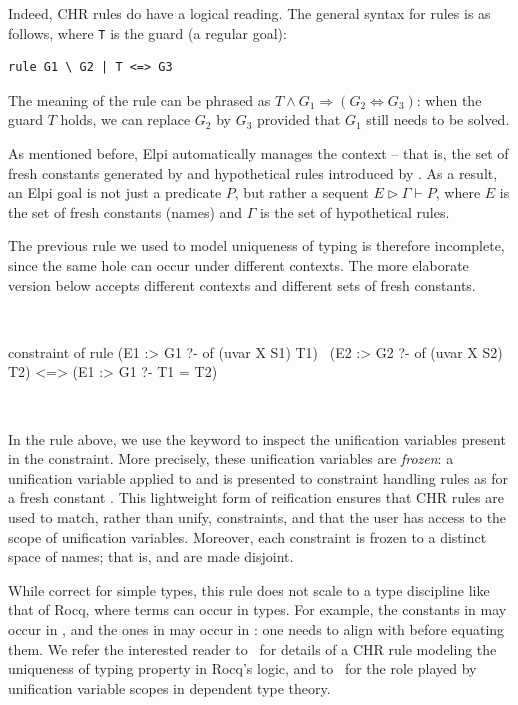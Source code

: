 \documentclass[a4paper, 11pt]{book}
\newenvironment{elpicode}
  {\VerbatimEnvironment~\\\begin{elpibox}\begin{xelpicode}}{\end{xelpicode}
\end{elpibox}\\}
\begin{document}
Indeed, CHR rules do have a logical reading. The general syntax for rules is
as follows, where \texttt{T} is the guard (a regular goal):

\begin{verbatim}
rule G1 \ G2 | T <=> G3
\end{verbatim}

\noindent
The meaning of the rule can be phrased as $T \land G_1 \Rightarrow (G_2
\Leftrightarrow G_3)$: when the guard $T$ holds, we can replace $G_2$ by $G_3$
provided that $G_1$ still needs to be solved.

As mentioned before, Elpi automatically manages the context -- that is, the set
of fresh constants generated by  and hypothetical rules introduced by
\elpi{=>}. As a result, an Elpi goal is not just a predicate $P$, but rather a
sequent $E \triangleright  \Gamma \vdash P$, where $E$ is the set of fresh
constants (names) and $\Gamma$ is the set of hypothetical rules.

The previous rule we used to model uniqueness of typing is therefore incomplete,
since the same hole can occur under different contexts. The more elaborate
version below accepts different contexts and different sets of fresh constants.


\begin{elpicode}
constraint of {
  rule (E1 :> G1 ?- of (uvar X S1) T1)
     \ (E2 :> G2 ?- of (uvar X S2) T2)
   <=> (E1 :> G1 ?- T1 = T2)
}
\end{elpicode}

\noindent
In the rule above, we use the keyword  to inspect the unification
variables present in the constraint. More precisely, these unification
variables are \emph{frozen}: a unification variable  applied to
 and  is presented to constraint handling rules as
 for a fresh constant . This lightweight form of
reification ensures that CHR rules are used to match, rather than unify,
constraints, and that the user has access to the scope of unification
variables. Moreover, each constraint is frozen to a distinct space of names;
that is,  and  are made disjoint.


While correct for simple types, this rule does not scale to a type
discipline like that of Rocq, where terms can occur in types. For example,
the constants in  may occur in , and the
ones in  may occur in : one needs to align 
with  before equating them.
We refer the interested reader to~\cite{TASSI_2019} for details of a CHR rule modeling
the uniqueness of typing property in Rocq's logic, and to~\cite{Jojgov} for
the role played by unification variable scopes in dependent type theory.
\end{document}
